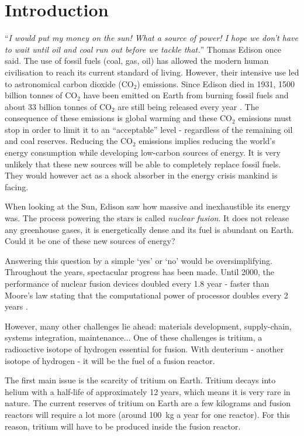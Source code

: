 \chapter*{Introduction}

``\textit{I would put my money on the sun! What a source of power! I hope we don't have to wait until oil and coal run out before we tackle that.}'' Thomas Edison once said.
The use of fossil fuels (coal, gas, oil) has allowed the modern human civilisation to reach its current standard of living.
However, their intensive use led to astronomical carbon dioxide (CO$_2$) emissions.
Since Edison died in 1931, 1500 billion tonnes of CO$_2$ have been emitted on Earth from burning fossil fuels and about 33 billion tonnes of CO$_2$ are still being released every year \cite{friedlingstein_global_2021}.
The consequence of these emissions is global warming and these CO$_2$ emissions must stop in order to limit it to an ``acceptable'' level - regardless of the remaining oil and coal reserves.
Reducing the CO$_2$ emissions implies reducing the world's energy consumption while developing low-carbon sources of energy.
It is very unlikely that these new sources will be able to completely replace fossil fuels.
They would however act as a shock absorber in the energy crisis mankind is facing.

When looking at the Sun, Edison saw how massive and inexhaustible its energy was.
The process powering the stars is called \textit{nuclear fusion}.
It does not release any greenhouse gases, it is energetically dense and its fuel is abundant on Earth.
Could it be one of these new sources of energy?

Answering this question by a simple `yes' or `no' would be oversimplifying.
Throughout the years, spectacular progress has been made.
Until 2000, the performance of nuclear fusion devices doubled every 1.8 year - faster than Moore's law stating that the computational power of processor doubles every 2 years \cite{webster_fusion_2003}.

However, many other challenges lie ahead: materials development, supply-chain, systems integration, maintenance...
One of these challenges is tritium, a radioactive isotope of hydrogen essential for fusion.
With deuterium - another isotope of hydrogen - it will be the fuel of a fusion reactor.

The first main issue is the scarcity of tritium on Earth.
Tritium decays into helium with a half-life of approximately 12 years, which means it is very rare in nature.
The current reserves of tritium on Earth are a few kilograms and fusion reactors will require a lot more (around \SI{100}{kg} a year for one reactor).
For this reason, tritium will have to be produced inside the fusion reactor.

